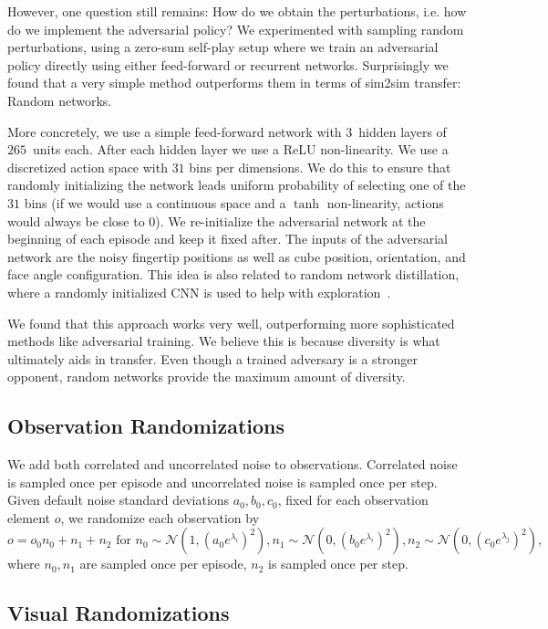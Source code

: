 However, one question still remains: How do we obtain the perturbations, i.e. how do we implement the adversarial policy? We experimented with sampling random perturbations, using a zero-sum self-play setup where we train an adversarial policy directly using either feed-forward or recurrent networks. Surprisingly we found that a very simple method outperforms them in terms of sim2sim transfer: Random networks.

More concretely, we use a simple feed-forward network with $3$~hidden layers of $265$~units each. After each hidden layer we use a ReLU non-linearity. We use a discretized action space with $31$ bins per dimensions. We do this to ensure that randomly initializing the network leads uniform probability of selecting one of the $31$ bins (if we would use a continuous space and a $\tanh$ non-linearity, actions would always be close to $0$). We re-initialize the adversarial network at the beginning of each episode and keep it fixed after. The inputs of the adversarial network are the noisy fingertip positions as well as cube position, orientation, and face angle configuration. This idea is also related to random network distillation, where a randomly initialized CNN is used to help with exploration~\citep{burda2018exploration}.

We found that this approach works very well, outperforming more sophisticated methods like adversarial training. We believe this is because diversity is what ultimately aids in transfer. Even though a trained adversary is a stronger opponent, random networks provide the maximum amount of diversity.

\subsection{Observation Randomizations}\label{sec:observation_randomizations}
We add both correlated and uncorrelated noise to observations. Correlated noise is sampled once per episode and uncorrelated noise is sampled once per step. Given default noise standard deviations $a_0, b_0, c_0$, fixed for each observation element $o$, we randomize each observation by 
\[
o = o_0 n_0 + n_1 + n_2 \textrm{ for } n_0 \sim \mathcal{N}(1, (a_0e^{\lambda_i})^2), n_1 \sim \mathcal{N}(0, (b_0 e^{\lambda_i})^2), n_2 \sim \mathcal{N}(0, (c_0e^{\lambda_j})^2),
\]
where $n_0, n_1$ are sampled once per episode, $n_2$ is sampled once per step.

\subsection{Visual Randomizations}
\label{app:visual_randomizations}

